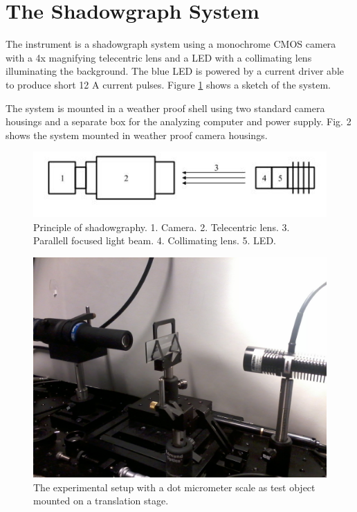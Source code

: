 \section{The Shadowgraph System}

The instrument is a shadowgraph system using a monochrome CMOS camera with a 4x magnifying telecentric lens and a LED with a collimating lens illuminating the background. The blue LED is powered by a current driver able to produce short 12 A current pulses. Figure \cref{fig:shadowprinc} shows a sketch of the system. 

The system is mounted in a weather proof shell using two standard camera housings and a separate box for the analyzing computer and power supply. Fig. 2 shows the system mounted in weather proof camera housings. 

\begin{figure}[ht]
\centering\includegraphics[width=0.75\linewidth]{./figures/shadowprinc.jpg}
\caption{Principle of shadowgraphy. 1. Camera. 2. Telecentric lens. 3. Parallell focused light beam. 4. Collimating lens. 5. LED.}
\label{fig:shadowprinc}
\end{figure}

\begin{figure}[ht]
\centering\includegraphics[width=0.75\linewidth]{figures/Foto0169}
\caption{The experimental setup with a dot micrometer scale as test object mounted on a translation stage.}
\end{figure}

